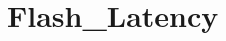 \hypertarget{group___flash___latency}{\section{Flash\-\_\-\-Latency}
\label{group___flash___latency}
}
